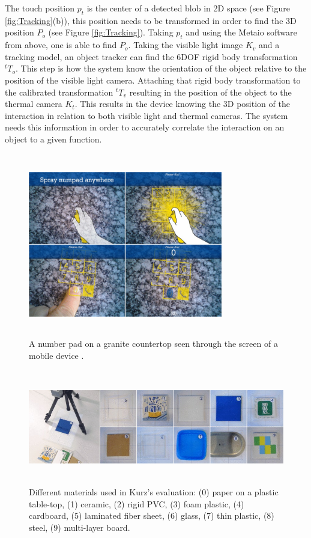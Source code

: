 \documentclass{sig-alternate}
\begin{document}
The touch position \(p_t\) is the center of a detected blob in 2D space (see Figure \ref{fig:Tracking}(b)), this position needs to be transformed in order to find the 3D position \(P_o\) (see Figure \ref{fig:Tracking}). Taking \(p_t\) and using the Metaio software from above, one is able to find \(P_o\). Taking the visible light image \(K_v\) and a tracking model, an object tracker can find the 6DOF rigid body transformation \({^t}T_o\). This step is how the system know the orientation of the object relative to the position of the visible light camera. Attaching that rigid body transformation to the calibrated transformation \({^t}T_v\) resulting in the position of the object to the thermal camera \(K_t\). This results in the device knowing the 3D position of the interaction in relation to both visible light and thermal cameras. The system needs this information in order to accurately correlate the interaction on an object to a given function.    
 
\begin{figure}
	\includegraphics[width=8.5cm, height=8cm]{numpad}
	\caption{A number pad on a granite countertop seen through the screen of a mobile device \cite{Thermal}.}
	\label{fig:numpad}
\end{figure}

\begin{figure}
	\includegraphics[width=18cm, height=5cm]{ThermalTesting}
	\caption{Different materials used in Kurz's evaluation: (0) paper on a plastic table-top, (1) ceramic, (2) rigid PVC, (3) foam plastic, (4) cardboard, (5) laminated fiber sheet, (6) glass, (7) thin plastic, (8) steel, (9) multi-layer board. \cite{Thermal}}
	\label{fig:ThermalTest}
\end{figure}
\end{document}
